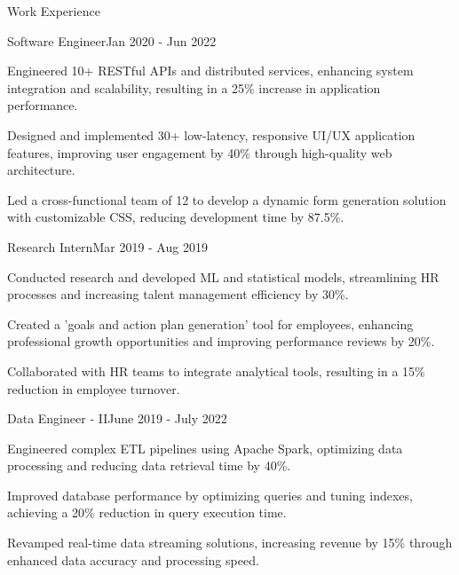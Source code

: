 \documentclass{resume} %
\begin{document}
    \begin{rSection}{Work Experience}
                    \begin{rSubsection}
                {Software Engineer}{Jan 2020 - Jun 2022}
                                    {}
                                {}
                                    \item Engineered 10+ RESTful APIs and distributed services, enhancing system integration and scalability, resulting in a 25\% increase in application performance.
                                    \item Designed and implemented 30+ low{-}latency, responsive UI/UX application features, improving user engagement by 40\% through high{-}quality web architecture.
                                    \item Led a cross{-}functional team of 12 to develop a dynamic form generation solution with customizable CSS, reducing development time by 87.5\%.
                            \end{rSubsection}
                    \begin{rSubsection}
                {Research Intern}{Mar 2019 - Aug 2019}
                                    {}
                                {}
                                    \item Conducted research and developed ML and statistical models, streamlining HR processes and increasing talent management efficiency by 30\%.
                                    \item Created a 'goals and action plan generation' tool for employees, enhancing professional growth opportunities and improving performance reviews by 20\%.
                                    \item Collaborated with HR teams to integrate analytical tools, resulting in a 15\% reduction in employee turnover.
                            \end{rSubsection}
                    \begin{rSubsection}
                {Data Engineer {-} II}{June 2019 - July 2022}
                                    {}
                                {}
                                    \item Engineered complex ETL pipelines using Apache Spark, optimizing data processing and reducing data retrieval time by 40\%.
                                    \item Improved database performance by optimizing queries and tuning indexes, achieving a 20\% reduction in query execution time.
                                    \item Revamped real{-}time data streaming solutions, increasing revenue by 15\% through enhanced data accuracy and processing speed.
                            \end{rSubsection}
            \end{rSection}
\end{document}
